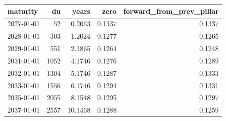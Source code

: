 \begin{tabular}{lrrrr}
\toprule
maturity & du & years & zero & forward_from_prev_pillar \\
\midrule
2027-01-01 & 52 & 0.2063 & 0.1337 & 0.1337 \\
2028-01-01 & 303 & 1.2024 & 0.1277 & 0.1265 \\
2029-01-01 & 551 & 2.1865 & 0.1264 & 0.1248 \\
2031-01-01 & 1052 & 4.1746 & 0.1276 & 0.1289 \\
2032-01-01 & 1304 & 5.1746 & 0.1287 & 0.1333 \\
2033-01-01 & 1556 & 6.1746 & 0.1294 & 0.1331 \\
2035-01-01 & 2055 & 8.1548 & 0.1295 & 0.1297 \\
2037-01-01 & 2557 & 10.1468 & 0.1288 & 0.1259 \\
\bottomrule
\end{tabular}
